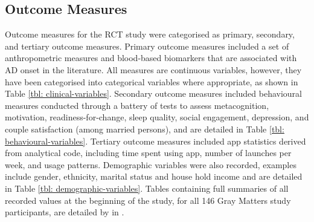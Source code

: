 \subsection{Outcome Measures}
Outcome measures for the RCT study were categorised as primary, secondary, and tertiary outcome measures.
\newline Primary outcome measures included a set of anthropometric measures and blood-based biomarkers that are associated with AD onset in the literature. All measures are continuous variables, however, they have been categorised into categorical variables where appropriate, as shown in Table \ref{tbl: clinical-variables}.
\newline Secondary outcome measures included behavioural measures conducted through a battery of tests to assess metacognition, motivation, readiness-for-change, sleep quality, social engagement, depression, and couple satisfaction (among married persons), and are detailed in Table \ref{tbl: behavioural-variables}.
\newline Tertiary outcome measures included app statistics derived from analytical code, including time spent using app, number of launches per week, and usage patterns. Demographic variables were also recorded, examples include gender, ethnicity, marital status and house hold income and are detailed in Table \ref{tbl: demographic-variables}.
\newline Tables containing full summaries of all recorded values at the beginning of the study, for all 146 Gray Matters study participants, are detailed by \citeauthor{Norton2015-TRCI} in \cite{Norton2015-TRCI}.

